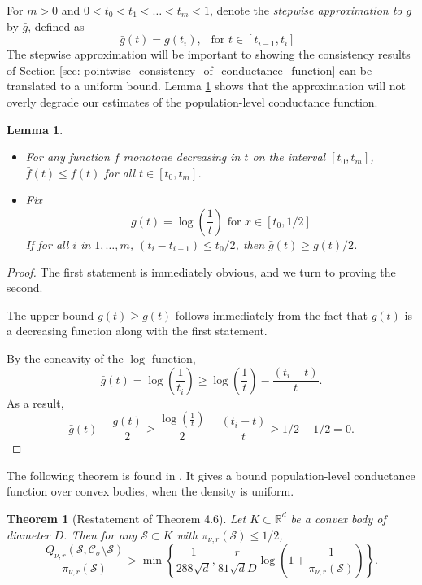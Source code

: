 \documentclass{article}
\newcommand{\Reals}{\mathbb{R}}
\newcommand{\Rd}{\Reals^d}
\newcommand{\1}{\mathbf{1}}
\newcommand{\Sset}{\mathcal{S}}
\newcommand{\Cset}{\mathcal{C}}
\newcommand{\Csig}{\Cset_{\sigma}}
\theoremstyle{aldenthm}
\newtheorem{lemma}{Lemma}
\newtheorem{theorem}{Theorem}
\begin{document}
For $m > 0$ and $0 < t_0 < t_1 < \ldots < t_m < 1$, denote the \emph{stepwise approximation to $g$} by $\bar{g}$, defined as
\begin{equation}
\label{eqn: stepwise_approximation}
\bar{g}(t) = g(t_i), ~~ \text{ for $t \in [t_{i-1}, t_i]$ }
\end{equation}
The stepwise approximation will be important to showing the consistency results of Section \ref{sec: pointwise_consistency_of_conductance_function} can be translated to a uniform bound. Lemma \ref{lem: stepwise_approximation} shows that the approximation will not overly degrade our estimates of the population-level conductance function.
\begin{lemma}
	\label{lem: stepwise_approximation}
	\begin{itemize}
		\item For any function $f$ monotone decreasing in $t$ on the interval $[t_0,t_m]$, $\bar{f}(t) \leq f(t)$ for all $t \in [t_0,t_m]$.
		\item Fix
		\begin{equation*}
		g(t) = \log\left(\frac{1}{t}\right) \text{ for $x \in [t_0, 1/2]$}
		\end{equation*}
		If for all $i$ in $1,\ldots,m$, $(t_i - t_{i - 1}) \leq t_0/2$, then $\bar{g}(t)\geq g(t) / 2$.
	\end{itemize}
\end{lemma}

\begin{proof}
	The first statement is immediately obvious, and we turn to proving the second. 
	
	The upper bound $g(t) \geq \bar{g}(t)$ follows immediately from the fact that $g(t)$ is a decreasing function along with the first statement.
	
	By the concavity of the $\log$ function, 
	\begin{equation*}
	\bar{g}(t) = \log\left(\frac{1}{t_i}\right) \geq \log\left(\frac{1}{t}\right) - \frac{(t_i - t)}{t}.
	\end{equation*}
	As a result,
	\begin{equation*}
	\bar{g}(t) - \frac{g(t)}{2} \geq \frac{\log\left(\frac{1}{t}\right)}{2} - \frac{(t_i - t)}{t} \geq 1/2 - 1/2 = 0.
	\end{equation*}
\end{proof}

The following theorem is found in \cite{kannan04}. It gives a bound population-level conductance function over convex bodies, when the density is uniform.
\begin{theorem}[Restatement of \cite{kannan04} Theorem 4.6]
	\label{thm: kannan}
	Let $K \subset \Rd$ be a convex body of diameter $D$. Then for any $\Sset \subset K$ with $\pi_{\nu,r}(\Sset) \leq 1/2$,
	\begin{equation}
	\label{eqn: kannan}
	\frac{Q_{\nu,r}(\Sset, \Csig \setminus \Sset)}{\pi_{\nu,r}(\Sset)} > \min\left\{\frac{1}{288\sqrt{d}},\frac{r}{81 \sqrt{d}D}\log\left(1 + \frac{1}{\pi_{\nu,r}(\Sset)}\right)\right\}.
	\end{equation}
\end{theorem}
\end{document}
